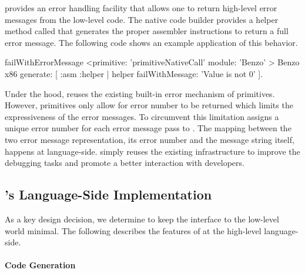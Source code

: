 \B provides an error handling facility that allows one to return high-level error messages from the low-level code.
The native code builder provides a helper method called  that generates the proper assembler instructions to return a full error message. The following code shows an example application of this behavior.
%
\begin{stcode}[emph={asm}]{5}
failWithErrorMessage
	<primitive: 'primitiveNativeCall' 
	 module: 'Benzo' >
	 Benzo x86 generate: [ :asm :helper |
		helper failWithMessage: 'Value is not 0' ].
\end{stcode}
%
Under the hood, \B reuses the existing built-in error mechanism of \PH primitives.
However, primitives only allow for error number to be returned which limits the expressiveness of the error messages.
To circumvent this limitation \B assigns a unique error number for each error message pass to .
The mapping between the two error message representation, its error number and the message string itself, happens at language-side.
\B simply reuses the existing infrastructure to improve the debugging tasks and promote a better interaction with developers.

\subsection{\B's Language-Side Implementation}
As a key design decision, we determine to keep the interface to the low-level world minimal.
The following describes the features of \B at the high-level language-side.

\paragraph{Code Generation}

